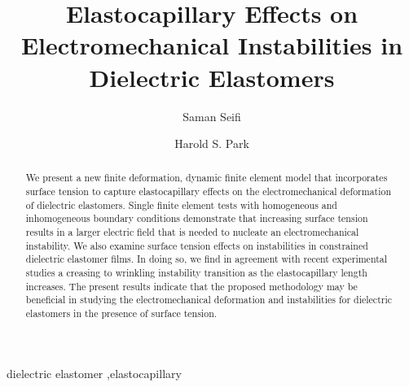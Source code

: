 \documentclass[final,authoryear,3p,times]{elsarticle}
\begin{document}
\begin{frontmatter}



\title{Elastocapillary Effects on Electromechanical Instabilities in Dielectric Elastomers}


\author[ss]{Saman Seifi}
\address[ss]{Department of Mechanical Engineering, Boston University, Boston, MA 02215}
\author[hsp]{Harold S. Park}
\address[hsp]{Department of Mechanical Engineering, Boston University, Boston, MA 02215}

\begin{abstract}

We present a new finite deformation, dynamic finite element model that incorporates surface tension to capture elastocapillary effects on the electromechanical deformation of dielectric elastomers.  Single finite element tests with homogeneous and inhomogeneous boundary conditions demonstrate that increasing surface tension results in a larger electric field that is needed to nucleate an electromechanical instability.  We also examine surface tension effects on instabilities in constrained dielectric elastomer films.  In doing so, we find in agreement with recent experimental studies a creasing to wrinkling instability transition as the elastocapillary length increases.  The present results indicate that the proposed methodology may be beneficial in studying the electromechanical deformation and instabilities for dielectric elastomers in the presence of surface tension. 

\end{abstract}

\begin{keyword}
dielectric elastomer \sep elastocapillary

\end{keyword} 

\end{frontmatter}
\end{document}
